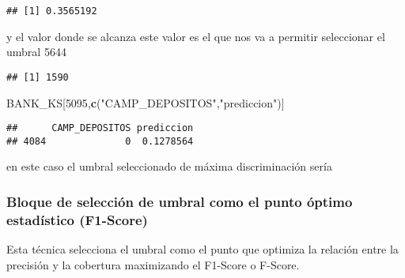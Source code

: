 \documentclass[]{article}
\newenvironment{Shaded}{\begin{snugshade}}{\end{snugshade}}
\newcommand{\KeywordTok}[1]{\textcolor[rgb]{0.13,0.29,0.53}{\textbf{#1}}}
\newcommand{\DecValTok}[1]{\textcolor[rgb]{0.00,0.00,0.81}{#1}}
\newcommand{\StringTok}[1]{\textcolor[rgb]{0.31,0.60,0.02}{#1}}
\newcommand{\OperatorTok}[1]{\textcolor[rgb]{0.81,0.36,0.00}{\textbf{#1}}}
\newcommand{\NormalTok}[1]{#1}
\begin{document}
\begin{verbatim}
## [1] 0.3565192
\end{verbatim}

y el valor donde se alcanza este valor es el que nos va a permitir
seleccionar el umbral 5644

\begin{Shaded}
\end{Shaded}

\begin{verbatim}
## [1] 1590
\end{verbatim}

\begin{Shaded}
\begin{Highlighting}[]
\NormalTok{BANK_KS[}\DecValTok{5095}\NormalTok{,}\KeywordTok{c}\NormalTok{(}\StringTok{"CAMP_DEPOSITOS"}\NormalTok{,}\StringTok{"prediccion"}\NormalTok{)]}
\end{Highlighting}
\end{Shaded}

\begin{verbatim}
##      CAMP_DEPOSITOS prediccion
## 4084              0  0.1278564
\end{verbatim}

en este caso el umbral seleccionado de máxima discriminación sería

\subsubsection{Bloque de selección de umbral como el punto óptimo
estadístico
(F1-Score)}\label{bloque-de-seleccion-de-umbral-como-el-punto-optimo-estadistico-f1-score}

Esta técnica selecciona el umbral como el punto que optimiza la relación
entre la precisión y la cobertura maximizando el F1-Score o F-Score.
\end{document}
